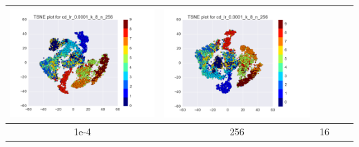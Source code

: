 \documentclass[12pt]{report}
\begin{document}
\begin{table}[H]
\begin{tabular}{ | c | c | c | c || c |}
\begin{minipage}{.3\textwidth}
      \includegraphics[scale=0.25]{cd_lr_0_0001_k_8_n_256.png}
    \end{minipage} &
    \begin{minipage}{.3\textwidth}
      \includegraphics[scale=0.25]{test_cd_lr_0_0001_k_8_n_256.png}
    \end{minipage}
        \\ \hline
    1e-4 & 256 & 16 &
    \begin{minipage}{.3\textwidth}

\end{minipage}
\end{tabular}
\end{table}
\end{document}

